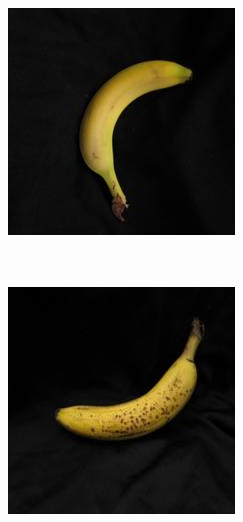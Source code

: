 \documentclass[final]{beamer}
\newlength{\onecolwid}
\begin{document}
\begin{frame}[t]
\begin{columns}[t]
\begin{column}{\onecolwid}
\begin{figure}
\begin{subfigure}{.123\textwidth}
\end{subfigure}%
  \begin{subfigure}{.123\textwidth}
  \centering
\includegraphics[width=\textwidth]{1_4.jpg}
\end{subfigure}\, %
  \begin{subfigure}{.123\textwidth}
  \centering
\includegraphics[width=\textwidth]{2_1.jpg}

\end{subfigure}
\end{figure}
\end{column}
\end{columns}
\end{frame}
\end{document}
